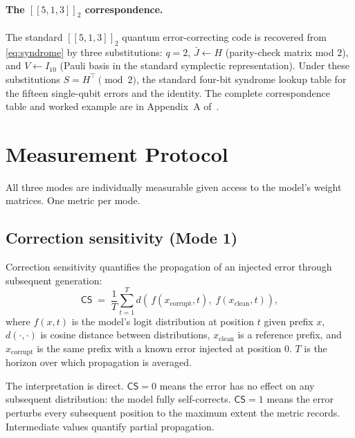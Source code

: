 \documentclass[11pt,a4paper]{article}
\newcommand{\Ccode}[3]{[\![#1,#2,#3]\!]}
\newcommand{\CS}{\mathsf{CS}}
\newcommand{\Jbar}{\bar{J}}
\begin{document}
\paragraph{The $\Ccode{5}{1}{3}_2$ correspondence.} The standard $\Ccode{5}{1}{3}_2$ quantum error-correcting code is recovered from \eqref{eq:syndrome} by three substitutions: $q = 2$, $\Jbar \leftarrow H$ (parity-check matrix mod $2$), and $V \leftarrow I_{10}$ (Pauli basis in the standard symplectic representation). Under these substitutions $S =
H^\top \pmod 2$, the standard four-bit syndrome lookup table for the fifteen single-qubit errors and the identity. The complete correspondence table and worked example are in Appendix~A of~\cite{SyndromeAlgebra}.


\section{Measurement Protocol}
\label{sec:protocol}

All three modes are individually measurable given access to the model's weight matrices. One metric per mode.


\subsection{Correction sensitivity (Mode 1)}
\label{sec:protocol-cs}

Correction sensitivity quantifies the propagation of an injected error through subsequent generation:
\begin{equation}
\label{eq:cs}
\CS \;=\; \frac{1}{T} \sum_{t=1}^{T} d\!\left(\,
  f(x_{\mathrm{corrupt}}, t),\;
  f(x_{\mathrm{clean}}, t)\right),
\end{equation}
where $f(x, t)$ is the model's logit distribution at position $t$ given prefix $x$, $d(\cdot,\cdot)$ is cosine distance between distributions, $x_{\mathrm{clean}}$ is a reference prefix, and $x_{\mathrm{corrupt}}$ is the same prefix with a known error injected at position $0$. $T$ is the horizon over which propagation is averaged.

The interpretation is direct. $\CS = 0$ means the error has no effect on any subsequent distribution: the model fully self-corrects. $\CS = 1$ means the error perturbs every subsequent position to the maximum extent the metric records. Intermediate values quantify partial propagation.
\end{document}
